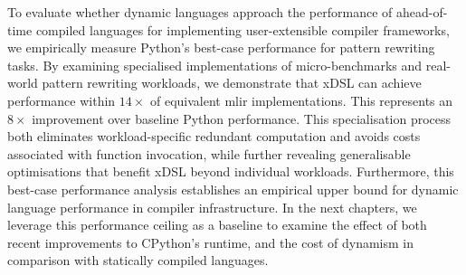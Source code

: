 To evaluate whether dynamic languages approach the performance of ahead-of-time compiled languages for implementing user-extensible compiler frameworks, we empirically measure Python's best-case performance for pattern rewriting tasks.
By examining specialised implementations of micro-benchmarks and real-world pattern rewriting workloads, we demonstrate that xDSL can achieve performance within $14\times$ of equivalent \ac{mlir} implementations. This represents an $8\times$ improvement over baseline Python performance.
This specialisation process both eliminates workload-specific redundant computation and avoids costs associated with function invocation, while further revealing generalisable optimisations that benefit xDSL beyond individual workloads.
Furthermore, this best-case performance analysis establishes an empirical upper bound for dynamic language performance in compiler infrastructure.
In the next chapters, we leverage this performance ceiling as a baseline to examine the effect of both recent improvements to CPython's runtime, and the cost of dynamism in comparison with statically compiled languages.